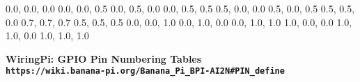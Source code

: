\documentclass[11pt,a4paper]{article}
\begin{document}
\begin{sffamily}
\definecolor{rtb-black}{rgb}  {0.0, 0.0, 0.0}
\definecolor{rtb-navy}{rgb}   {0.0, 0.0, 0.5}
\definecolor{rtb-green}{rgb}  {0.0, 0.5, 0.0}
\definecolor{rtb-teal}{rgb}   {0.0, 0.5, 0.5}
\definecolor{rtb-maroon}{rgb} {0.5, 0.0, 0.0}
\definecolor{rtb-purple}{rgb} {0.5, 0.0, 0.5}
\definecolor{rtb-olive}{rgb}  {0.5, 0.5, 0.0}
\definecolor{rtb-silver}{rgb} {0.7, 0.7, 0.7}
\definecolor{rtb-grey}{rgb}   {0.5, 0.5, 0.5}
\definecolor{rtb-blue}{rgb}   {0.0, 0.0, 1.0}
\definecolor{rtb-lime}{rgb}   {0.0, 1.0, 0.0}
\definecolor{rtb-aqua}{rgb}   {0.0, 1.0, 1.0}
\definecolor{rtb-red}{rgb}    {1.0, 0.0, 0.0}
\definecolor{rtb-yellow}{rgb} {1.0, 1.0, 0.0}
\definecolor{rtb-white}{rgb}  {1.0, 1.0, 1.0}

\begin{center}
\bfseries{WiringPi: GPIO Pin Numbering Tables}\\
\tt{https://wiki.banana-pi.org/Banana_Pi_BPI-AI2N#PIN_define}
\end{center}


\end{sffamily}
\end{document}
